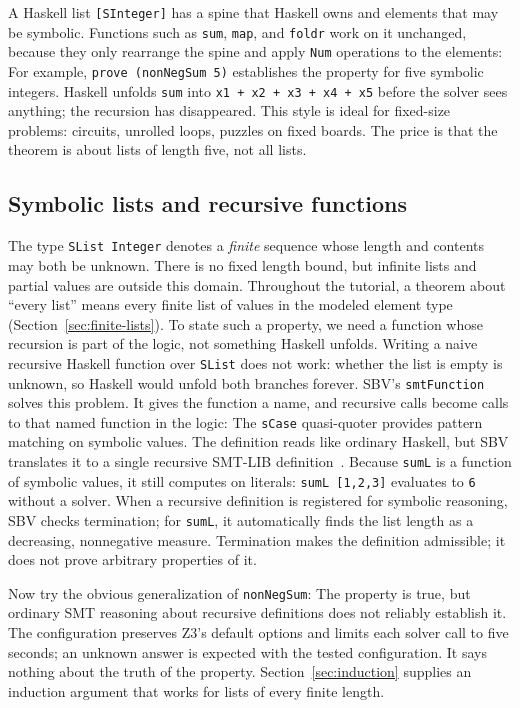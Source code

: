 \documentclass[acmsmall,screen,review,anonymous,nonacm]{acmart}
\newcommand{\code}[1]{\texttt{#1}}
\begin{document}
A Haskell list \code{[SInteger]} has a spine that Haskell owns and elements that
may be symbolic. Functions such as \code{sum}, \code{map}, and \code{foldr} work
on it unchanged, because they only rearrange the spine and apply \code{Num}
operations to the elements:
For example, \code{prove (nonNegSum 5)} establishes the property for five
symbolic integers. Haskell
unfolds \code{sum} into \code{x1 + x2 + x3 + x4 + x5} before the solver sees
anything; the recursion has disappeared. This style is ideal for fixed-size
problems: circuits, unrolled loops, puzzles on fixed boards. The price is that
the theorem is about lists of length five, not all lists.

\subsection{Symbolic lists and recursive functions}

The type \code{SList Integer} denotes a \emph{finite} sequence whose length and
contents may both be unknown. There is no fixed length bound, but infinite lists
and partial values are outside this domain. Throughout the tutorial, a theorem
about ``every list'' means every finite list of values in the modeled element
type (Section~\ref{sec:finite-lists}). To state such a property, we need a function whose
recursion is part of the logic, not something Haskell unfolds. Writing a naive
recursive Haskell function over \code{SList} does not work: whether the list is
empty is unknown, so Haskell would unfold both branches forever.
SBV's \code{smtFunction} solves this problem. It gives the function a name, and
recursive calls become calls to that named function in the logic:
The \code{sCase} quasi-quoter provides pattern matching on symbolic values. The
definition reads like ordinary Haskell, but SBV translates it to a single
recursive SMT-LIB definition~\citep{smtlib}. Because \code{sumL} is a function
of symbolic values, it still computes on literals: \code{sumL [1,2,3]} evaluates
to \code{6} without a solver. When a recursive definition is registered for
symbolic reasoning, SBV checks termination; for \code{sumL}, it automatically
finds the list length as a decreasing, nonnegative measure. Termination makes
the definition admissible; it does not prove arbitrary properties of it.

Now try the obvious generalization of \code{nonNegSum}:
The property is true, but ordinary SMT reasoning about recursive definitions
does not reliably establish it. The configuration preserves Z3's default options
and limits each solver call to five seconds; an unknown answer is expected
with the tested configuration.
It says nothing about the truth of the property. Section~\ref{sec:induction}
supplies an induction argument that works for lists of every finite length.
\end{document}
